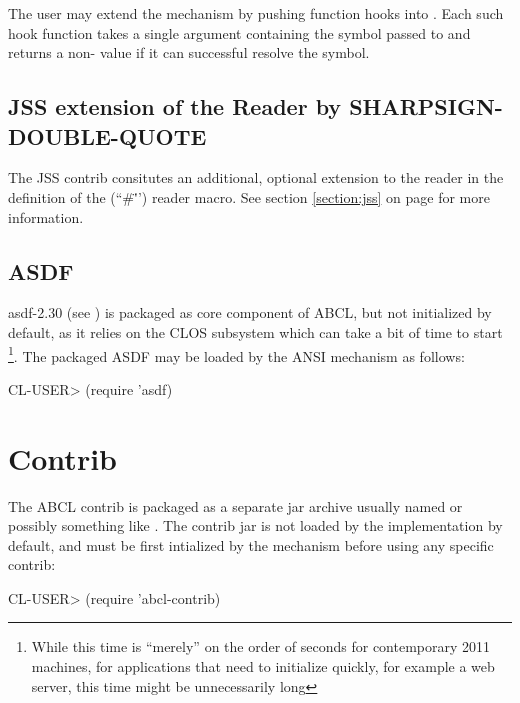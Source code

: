 \documentclass[10pt]{book}
\begin{document}
The user may extend the  mechanism by pushing
function hooks into .  Each
such hook function takes a single argument containing the symbol
passed to  and returns a non- value if it
can successful resolve the symbol.

\section{JSS extension of the Reader by SHARPSIGN-DOUBLE-QUOTE}

The JSS contrib consitutes an additional, optional extension to the
reader in the definition of the 
(``\#\"'') reader macro.  See section \ref{section:jss} on page
\pageref{section:jss} for more information.

\section{ASDF}

asdf-2.30 (see \cite{asdf}) is packaged as core component of \textsc{ABCL},
but not initialized by default, as it relies on the \textsc{CLOS} subsystem
which can take a bit of time to start \footnote{While this time is
  ``merely'' on the order of seconds for contemporary 2011 machines,
  for applications that need to initialize quickly, for example a web
  server, this time might be unnecessarily long}.  The packaged \textsc{ASDF}
may be loaded by the \textsc{ANSI}  mechanism as
follows:

\begin{listing-lisp}
CL-USER> (require 'asdf)
\end{listing-lisp}

\chapter{Contrib}

The \textsc{ABCL} contrib is packaged as a separate jar archive usually named
 or possibly something like
.  The contrib jar is not loaded by the
implementation by default, and must be first intialized by the
 mechanism before using any specific contrib:

\begin{listing-lisp}
CL-USER> (require 'abcl-contrib)
\end{listing-lisp}
\end{document}
